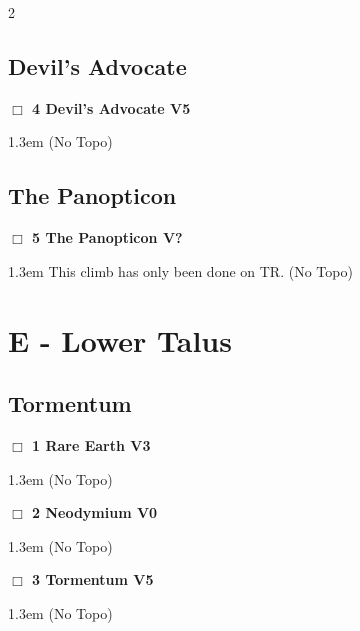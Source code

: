 \begin{multicols}{2}
\subsection*{Devil's Advocate}\label{bf:Devil's Advocate}
\needspace{2em}
\label{rt:Devil's Advocate}
\colorbox{RoyalBlue!20}{
\parbox{0.95\linewidth}{
\hspace{-1ex}\textbf{$\Box$
4 Devil's Advocate V5  \warn
}}}
\begin{adjustwidth}{1.3em}{}			
  (No Topo)
\end{adjustwidth}
\needspace{10em}
\subsection*{The Panopticon}\label{bf:The Panopticon}
\needspace{2em}
\label{rt:The Panopticon}
\colorbox{black!20}{
\parbox{0.95\linewidth}{
\hspace{-1ex}\textbf{$\Box$
5 The Panopticon V?  \warn\warn
}}}
\begin{adjustwidth}{1.3em}{}			
This climb has only been done on TR.
  (No Topo)
\end{adjustwidth}
\newpage
\section{E - Lower Talus}\label{sa:Lower Talus}
\needspace{10em}
\subsection*{Tormentum}\label{bf:Tormentum}
\needspace{2em}
\label{rt:Rare Earth}
\colorbox{green!20}{
\parbox{0.95\linewidth}{
\hspace{-1ex}\textbf{$\Box$
1 Rare Earth V3  
}}}
\begin{adjustwidth}{1.3em}{}			
  (No Topo)
\end{adjustwidth}
\needspace{2em}
\label{rt:Neodymium}
\colorbox{green!20}{
\parbox{0.95\linewidth}{
\hspace{-1ex}\textbf{$\Box$
2 Neodymium V0  \warn
}}}
\begin{adjustwidth}{1.3em}{}			
  (No Topo)
\end{adjustwidth}
\needspace{2em}
\label{rt:Tormentum}
\colorbox{RoyalBlue!20}{
\parbox{0.95\linewidth}{
\hspace{-1ex}\textbf{$\Box$
3 Tormentum V5  \warn
}}}
\begin{adjustwidth}{1.3em}{}			
  (No Topo)
\end{adjustwidth}
\needspace{10em}

\end{multicols}

